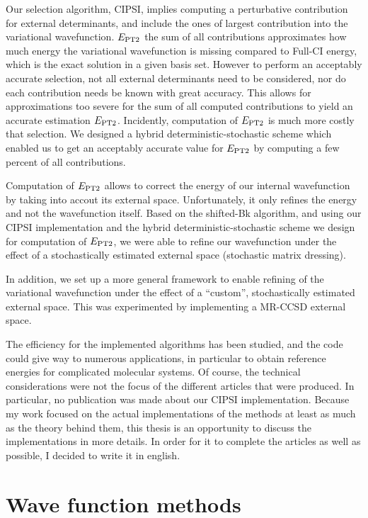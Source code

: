 \documentclass[12pt,a4paper]{report}
\begin{document}
Our selection algorithm, CIPSI, implies computing a perturbative contribution for external determinants, and include the ones of largest contribution into the variational wavefunction. $E_\text{PT2}$ the sum of all contributions approximates how much energy the variational wavefunction is missing compared to Full-CI energy, which is the exact solution in a given basis set. However to perform an acceptably accurate selection, not all external determinants need to be considered, nor do each contribution needs be known with great accuracy. This allows for approximations too severe for the sum of all computed contributions to yield an accurate estimation $E_\text{PT2}$. Incidently, computation of $E_\text{PT2}$ is much more costly that selection. We designed a hybrid deterministic-stochastic scheme which enabled us to get an acceptably accurate value for $E_\text{PT2}$ by computing a few percent of all contributions.

Computation of $E_\text{PT2}$ allows to correct the energy of our internal wavefunction by taking into accout its external space. Unfortunately, it only refines the energy and not the wavefunction itself. Based on the shifted-Bk algorithm, and using our CIPSI implementation and the hybrid deterministic-stochastic scheme we design for computation of $E_\text{PT2}$, we were able to refine our wavefunction under the effect of a stochastically estimated external space (stochastic matrix dressing).

In addition, we set up a more general framework to enable refining of the variational wavefunction under the effect of a ``custom'', stochastically estimated external space. This was experimented by implementing a MR-CCSD external space.


The efficiency for the implemented algorithms has been studied, and the code could give way to numerous applications, in particular to obtain reference energies for complicated molecular systems.
Of course, the technical considerations were not the focus of the different articles that were produced. In particular, no publication was made about our CIPSI implementation. Because my work focused on the actual implementations of the methods at least as much as the theory behind them, this thesis is an opportunity to discuss the implementations in more details. In order for it to complete the articles as well as possible, I decided to write it in english.



\chapter{Wave function methods}
\minitoc

\end{document}
